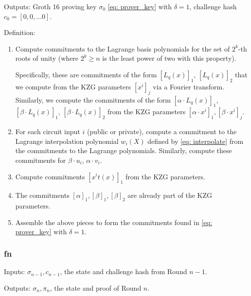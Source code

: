 Outputs: Groth 16 proving key $\sigma_0$ \eqref{eq: prover_key} with $\delta = 1$, challenge hash $c_0 = [0, 0, \ldots 0]$.

Definition:
\begin{enumerate}
    \item Compute commitments to the Lagrange basis polynomials for the set of $2^k$-th roots of unity (where $2^k \ge n$ is the least power of two with this property). 
    
    Specifically, these are commitments of the form $[L_q(x)]_1$, $[L_q(x)]_2$ that we compute from the KZG parameters $[x^i]_j$ via a Fourier transform. Similarly, we compute the commitments of the form $[\alpha \cdot L_q(x)]_1$, $[\beta \cdot L_q(x)]_1$, $[\beta \cdot L_q(x)]_2$ from the KZG parameters $[\alpha \cdot x^i]_1, [\beta \cdot x^i]_j$.
    \item For each circuit input $i$ (public or private), compute a commitment to the Lagrange interpolation polynomial $w_i(X)$ defined by \eqref{eq: interpolate} from the commitments to the Lagrange polynomials. Similarly, compute these commitments for $\beta \cdot u_i$, $\alpha \cdot v_i$.
    \item Compute commitments $[x^i t(x)]_1$ from the KZG parameters.
    \item The commitments $[\alpha]_1, [\beta]_1, [\beta]_2$ are already part of the KZG parameters.
    \item Assemble the above pieces to form the commitments found in \eqref{eq: prover_key} with $\delta = 1$.
\end{enumerate}

\subsubsection*{fn \contribute{}}
Inputs: $\sigma_{n-1}, c_{n-1}$, the state and challenge hash from Round $n-1$.

Outputs: $\sigma_n, \pi_n$, the state and proof of Round $n$.


